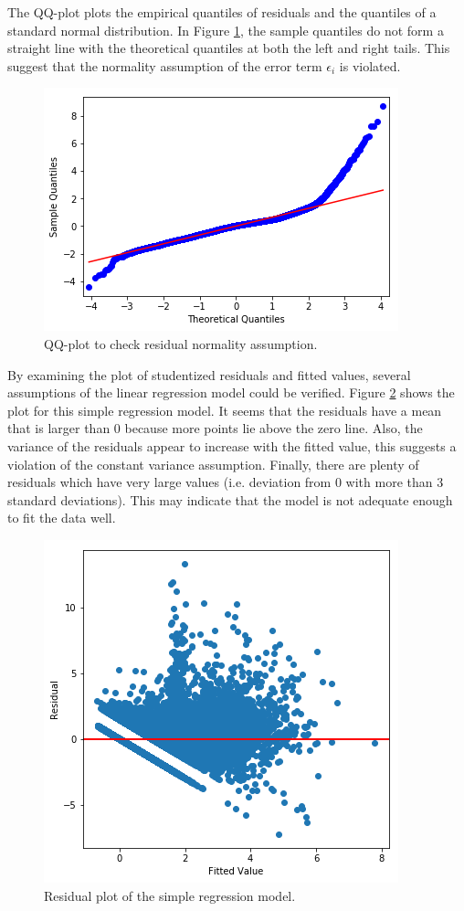 \documentclass[]{article}
\begin{document}
The QQ-plot plots the empirical quantiles of residuals and the quantiles of a standard normal distribution. In Figure \ref{fig:qq_plot_simple}, the sample quantiles do not form a straight line with the theoretical quantiles at both the left and right tails. This suggest that the normality assumption of the error term $\epsilon_i$ is violated. 
%
\begin{figure}[hbtp]
	\centering
	\includegraphics[width=.6\columnwidth]{../Figures/normality_check_simple}
	\caption{QQ-plot to check residual normality assumption.}
	\label{fig:qq_plot_simple}
\end{figure}
%

By examining the plot of studentized residuals and fitted values, several assumptions of the linear regression model could be verified. Figure \ref{fig:residual_plot_simple} shows the plot for this simple regression model. It seems that the residuals have a mean that is larger than 0 because more points lie above the zero line. Also, the variance of the residuals appear to increase with the fitted value, this suggests a violation of the constant variance assumption. Finally, there are plenty of residuals which have very large values (i.e. deviation from 0 with more than 3 standard deviations). This may indicate that the model is not adequate enough to fit the data well. 
%
\begin{figure}[hbtp]
	\centering
	\includegraphics[width=.6\columnwidth]{../Figures/residual_plot_simple}
	\caption{Residual plot of the simple regression model.}
	\label{fig:residual_plot_simple}
\end{figure}
%
\end{document}
